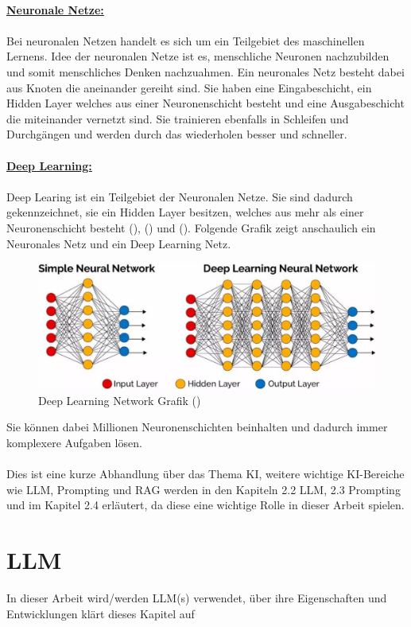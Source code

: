\documentclass[12pt,toc=bib,toc=listof]{scrreprt}
\begin{document}
\\
\textbf{\underline{Neuronale Netze:}}\\
\\
Bei neuronalen Netzen handelt es sich um ein Teilgebiet des maschinellen Lernens. Idee der neuronalen Netze ist es, menschliche Neuronen nachzubilden und somit menschliches Denken nachzuahmen. Ein neuronales Netz besteht dabei aus Knoten die aneinander gereiht sind. Sie haben eine Eingabeschicht, ein Hidden Layer welches aus einer Neuronenschicht besteht und eine Ausgabeschicht die miteinander vernetzt sind. Sie trainieren ebenfalls in Schleifen und Durchgängen und werden durch das wiederholen besser und schneller.\\
\\
\textbf{\underline{Deep Learning:}}\\
\\
Deep Learing ist ein Teilgebiet der Neuronalen Netze. Sie sind dadurch gekennzeichnet, sie ein Hidden Layer besitzen, welches aus mehr als einer Neuronenschicht besteht (\cite{Bhatt2021}), (\cite{Dymatrix2018}) und (\cite{Zhu2021}). Folgende Grafik zeigt anschaulich ein Neuronales Netz und ein Deep Learning Netz.
\begin{figure} [H]
    \centering
    \includegraphics[width=0.75\linewidth]{./Bilder/Dymatrix_Deep_Learning_Networks.jpg}
    \caption{Deep Learning Network Grafik (\cite{Dymatrix2018})}
    \label{fig:enter-label}
\end{figure}
\noindent Sie können dabei Millionen Neuronenschichten beinhalten und dadurch immer komplexere Aufgaben lösen.\\
\\
Dies ist eine kurze Abhandlung über das Thema KI, weitere wichtige KI-Bereiche wie LLM, Prompting und RAG werden in den Kapiteln 2.2 LLM, 2.3 Prompting und im Kapitel 2.4 erläutert, da diese eine wichtige Rolle in dieser Arbeit spielen.
\newpage

\noindent\section{LLM} %
\label{sec:llm}
In dieser Arbeit wird/werden LLM(s) verwendet, über ihre Eigenschaften und Entwicklungen klärt dieses Kapitel auf
\end{document}
